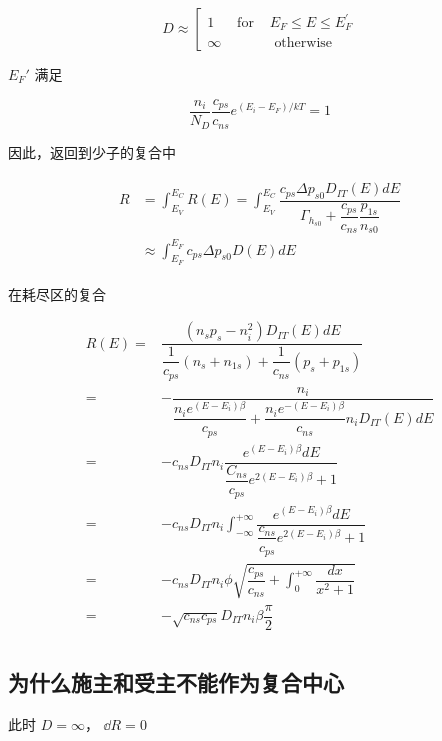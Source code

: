 \documentclass[cn,11pt,chinese,black,simple]{../elegantbook}
\begin{document}
\[D \approx\left[\begin{array}{ccc}
    1 & \text { for } & E_{F} \leq E \leq E_{F}^{\prime} \\
    \infty & & \text { otherwise }
\end{array}\right.\]


\(E_F'\) 满足

\[\dfrac{n_{ i }}{N_{ D }} \dfrac{c_{ ps }}{c_{ ns }} e^{\left(E_{ i }-E_F\right) / k T}=1\]

因此，返回到少子的复合中

\[\begin{array}{l}
    \begin{aligned}
        
        R&=\int_{E_{V}}^{E_{C}} R(E)=\int_{E_{V}}^{E_{C}} \dfrac{c_{p s} \Delta p_{s 0} D_{I T}(E) d E}{\Gamma_{h_{s 0}}+\dfrac{c_{p s}}{c_{n s}} \dfrac{p_{1 s}}{n_{s 0}}} \\
        &\approx \int_{E_{F}}^{E_{F}} c_{p s} \Delta p_{s 0} D(E) d E
    \end{aligned}
\end{array}\]

在耗尽区的复合

    \begin{equation*}
        \begin{aligned}
            R(E)=& \dfrac{\left(n_{s} p_{s}-n_{i}^{2}\right) D_{I T}(E) d E}{\dfrac{1}{c_{p s}}\left(n_{s}+n_{1 s}\right)+\dfrac{1}{c_{n s}}\left(p_{s}+p_{1 s}\right)} \\
            =&-\dfrac{n_{i}}{\dfrac{n_{i} e^{\left(E-E_{i}\right) \beta}}{c_{p s}}+\dfrac{n_{i} e^{-\left(E-E_{i}\right) \beta}}{c_{n s}} n_{i} D_{I T}(E) d E} \\
            =&-c_{n s} D_{I T} n_{i} \dfrac{e^{\left(E-E_{i}\right) \beta} d E}{\dfrac{C_{n s}}{c_{p s}} e^{2\left(E-E_{i}\right) \beta}+1}\\
            =&-c_{n s} D_{I T} n_{i} \int_{-\infty}^{+\infty} \dfrac{e^{\left(E-E_{i}\right) \beta} d E}{\dfrac{c_{n s}}{c_{p s}} e^{2\left(E-E_{i}\right) \beta}+1} \\
            =&-c_{n s} D_{I T} n_{i} \phi \sqrt{\dfrac{c_{p s}}{c_{n s}}+\int_{0}^{+\infty} \dfrac{d x}{x^{2}+1}} \\
            =&-\sqrt{c_{n s} c_{p s}} D_{I T} n_{i} \beta \dfrac{\pi}{2} \\
        \end{aligned}
    \end{equation*}

\subsection{为什么施主和受主不能作为复合中心}

此时 \(D = \infty\)， \(\dd{R} = 0\)

\ifx\mainclass\undefined
\end{document}

